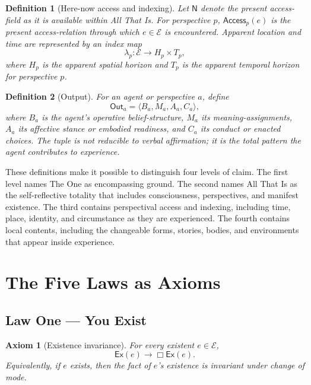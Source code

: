 \documentclass[11pt]{article}
\newtheorem{definition}{Definition}
\newtheorem{axiom}{Axiom}
\newcommand{\Ex}{\mathsf{Ex}}
\newcommand{\Now}{\mathsf{N}}
\newcommand{\Ent}{\mathcal{E}}
\newcommand{\Access}{\mathsf{Access}}
\newcommand{\Out}{\mathsf{Out}}
\begin{document}
\begin{definition}[Here-now access and indexing]
Let $\Now$ denote the present access-field as it is available within All That Is.  For perspective $p$, $\Access_p(e)$ is the present access-relation through which $e\in\Ent$ is encountered.  Apparent location and time are represented by an index map
\[
\lambda_p:\Ent\to H_p\times T_p,
\]
where $H_p$ is the apparent spatial horizon and $T_p$ is the apparent temporal horizon for perspective $p$.
\end{definition}

\begin{definition}[Output]
For an agent or perspective $a$, define
\[
\Out_a = \langle B_a,M_a,A_a,C_a\rangle,
\]
where $B_a$ is the agent's operative belief-structure, $M_a$ its meaning-assignments, $A_a$ its affective stance or embodied readiness, and $C_a$ its conduct or enacted choices.  The tuple is not reducible to verbal affirmation; it is the total pattern the agent contributes to experience.
\end{definition}

These definitions make it possible to distinguish four levels of claim.  The first level names The One as encompassing ground.  The second names All That Is as the self-reflective totality that includes consciousness, perspectives, and manifest existence.  The third contains perspectival access and indexing, including time, place, identity, and circumstance as they are experienced.  The fourth contains local contents, including the changeable forms, stories, bodies, and environments that appear inside experience.

\section{The Five Laws as Axioms}

\subsection{Law One --- You Exist}

\begin{axiom}[Existence invariance]
For every existent $e\in\Ent$,
\[
\Ex(e) \rightarrow \Box \Ex(e).
\]
Equivalently, if $e$ exists, then the fact of $e$'s existence is invariant under change of mode.
\end{axiom}
\end{document}
